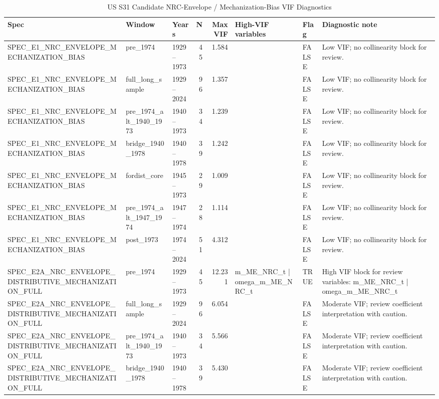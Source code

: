 \begin{table}[!htbp]
\centering
\small
\caption{US S31 Candidate NRC-Envelope / Mechanization-Bias VIF Diagnostics}
\label{tab:us_s31_candidate_mechanization_vif}
\begin{tabular}{lllrrlll}
\hline
Spec & Window & Years & N & Max VIF & High-VIF variables & Flag & Diagnostic note \\
\hline
SPEC\_E1\_NRC\_ENVELOPE\_MECHANIZATION\_BIAS & pre\_1974 & 1929--1973 & 45 & 1.584 &  & FALSE & Low VIF; no collinearity block for review. \\
SPEC\_E1\_NRC\_ENVELOPE\_MECHANIZATION\_BIAS & full\_long\_sample & 1929--2024 & 96 & 1.357 &  & FALSE & Low VIF; no collinearity block for review. \\
SPEC\_E1\_NRC\_ENVELOPE\_MECHANIZATION\_BIAS & pre\_1974\_alt\_1940\_1973 & 1940--1973 & 34 & 1.239 &  & FALSE & Low VIF; no collinearity block for review. \\
SPEC\_E1\_NRC\_ENVELOPE\_MECHANIZATION\_BIAS & bridge\_1940\_1978 & 1940--1978 & 39 & 1.242 &  & FALSE & Low VIF; no collinearity block for review. \\
SPEC\_E1\_NRC\_ENVELOPE\_MECHANIZATION\_BIAS & fordist\_core & 1945--1973 & 29 & 1.009 &  & FALSE & Low VIF; no collinearity block for review. \\
SPEC\_E1\_NRC\_ENVELOPE\_MECHANIZATION\_BIAS & pre\_1974\_alt\_1947\_1974 & 1947--1974 & 28 & 1.114 &  & FALSE & Low VIF; no collinearity block for review. \\
SPEC\_E1\_NRC\_ENVELOPE\_MECHANIZATION\_BIAS & post\_1973 & 1974--2024 & 51 & 4.312 &  & FALSE & Low VIF; no collinearity block for review. \\
SPEC\_E2A\_NRC\_ENVELOPE\_DISTRIBUTIVE\_MECHANIZATION\_FULL & pre\_1974 & 1929--1973 & 45 & 12.231 & m\_ME\_NRC\_t | omega\_m\_ME\_NRC\_t & TRUE & High VIF block for review variables: m\_ME\_NRC\_t | omega\_m\_ME\_NRC\_t \\
SPEC\_E2A\_NRC\_ENVELOPE\_DISTRIBUTIVE\_MECHANIZATION\_FULL & full\_long\_sample & 1929--2024 & 96 & 6.054 &  & FALSE & Moderate VIF; review coefficient interpretation with caution. \\
SPEC\_E2A\_NRC\_ENVELOPE\_DISTRIBUTIVE\_MECHANIZATION\_FULL & pre\_1974\_alt\_1940\_1973 & 1940--1973 & 34 & 5.566 &  & FALSE & Moderate VIF; review coefficient interpretation with caution. \\
SPEC\_E2A\_NRC\_ENVELOPE\_DISTRIBUTIVE\_MECHANIZATION\_FULL & bridge\_1940\_1978 & 1940--1978 & 39 & 5.430 &  & FALSE & Moderate VIF; review coefficient interpretation with caution. \\

\end{tabular}
\end{table}
